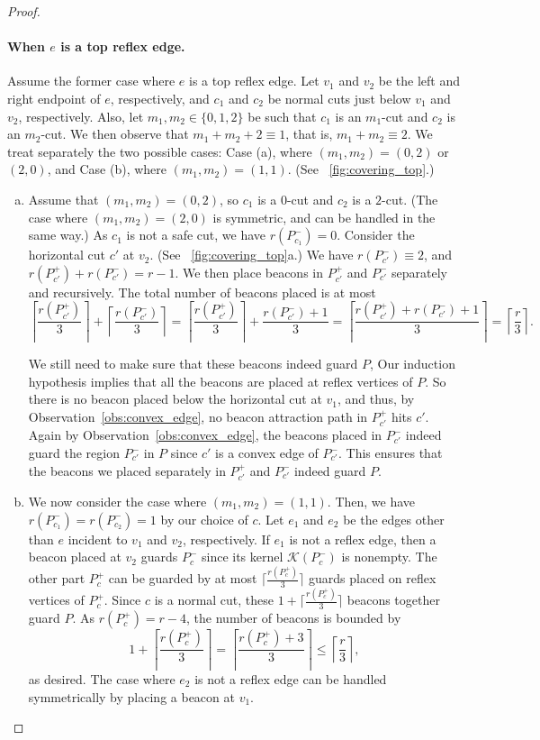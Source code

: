 \documentclass[11pt]{article}
\newcommand{\Kernel}{\mathcal{K}}
\theoremstyle{definition}
\let\leq\leqslant
\begin{document}
\begin{proof}
\paragraph{When $e$ is a top reflex edge.}
Assume the former case where $e$ is a top reflex edge.
Let $v_1$ and $v_2$ be the left and right endpoint of $e$, respectively, and
$c_1$ and $c_2$ be normal cuts just below $v_1$ and $v_2$,
respectively.
Also, let $m_1,m_2\in \{0, 1, 2\}$ be such that
$c_1$ is an $m_1$-cut and $c_2$ is an $m_2$-cut.
We then observe that $m_1 + m_2 + 2 \equiv 1$, that is, $m_1 + m_2 \equiv 2$.
We treat separately the two possible cases: 
Case (a), where $(m_1,m_2)=(0, 2)$ or $(2, 0)$, and Case (b), where $(m_1,m_2)=(1,1)$.
(See \figurename~\ref{fig:covering_top}.)
\begin{enumerate}[(a)] \item Assume that $(m_1, m_2) = (0, 2)$, so $c_1$ is a $0$-cut and $c_2$ is a $2$-cut.
 (The case where $(m_1, m_2) = (2, 0)$ is symmetric, and can be handled in the same way.)
 As $c_1$ is not a safe cut, we have $r(P^-_{c_1}) = 0$.
 Consider the horizontal cut $c'$ at $v_2$.
 (See \figurename~\ref{fig:covering_top}a.)
We have $r(P^-_{c'}) \equiv 2$, and $r(P^+_{c'}) + r(P^-_{c'}) = r - 1$.
 We then place beacons in $P^+_{c'}$ and $P^-_{c'}$ separately and recursively.
 The total number of beacons placed is at most
 \[ \left\lceil \frac{r(P^+_{c'})}{3} \right\rceil + \left\lceil \frac{r(P^-_{c'})}{3} \right\rceil
   = \left\lceil \frac{r(P^+_{c'})}{3} \right\rceil + \frac{r(P^-_{c'}) + 1}{3}
   = \left\lceil \frac{r(P^+_{c'})+r(P^-_{c'})+1}{3} \right\rceil = \left\lceil \frac{r}{3} \right\rceil.\]

 We still need to make sure that these beacons indeed guard $P$,
 Our induction hypothesis implies that all the beacons are placed at reflex vertices of $P$.
 So there is no beacon placed below the horizontal cut at $v_1$,
 and thus, by Observation~\ref{obs:convex_edge}, no beacon attraction path in $P^+_{c'}$ hits $c'$.
 Again by Observation~\ref{obs:convex_edge}, the beacons placed in $P^-_{c'}$ indeed guard
 the region $P^-_{c'}$ in $P$ since $c'$ is a convex edge of $P^-_{c'}$.
 This ensures that the beacons we placed separately in $P^+_{c'}$ and $P^-_{c'}$
 indeed guard $P$.

\item We now consider the case where $(m_1, m_2) = (1, 1)$.
 Then, we have $r(P^-_{c_1}) = r(P^-_{c_2}) = 1$ by our choice of $c$.
 Let $e_1$ and $e_2$ be the edges other than $e$  incident to $v_1$ and $v_2$, respectively.
 If $e_1$ is not a reflex edge, then a beacon placed at $v_2$ guards $P^-_c$
 since its kernel $\Kernel(P^-_c)$ is nonempty.
 The other part $P^+_c$ can be guarded by at most $\lceil \frac{r(P^+_c)}{3} \rceil$
 guards placed on reflex vertices of $P^+_c$.
 Since $c$ is a normal cut, these $1+\lceil \frac{r(P^+_c)}{3} \rceil$ beacons
 together guard $P$.
 As $r(P^+_c) = r - 4$, the number of beacons is bounded by
 \[ 1+\left\lceil \frac{r(P^+_c)}{3} \right\rceil = \left\lceil \frac{r(P^+_c)+3}{3} \right\rceil
  \leq \left\lceil \frac{r}{3} \right\rceil,\]
 as desired.
 The case where $e_2$ is not a reflex edge   can be handled symmetrically
 by placing a beacon at $v_1$.


\end{enumerate}
\end{proof}
\end{document}
